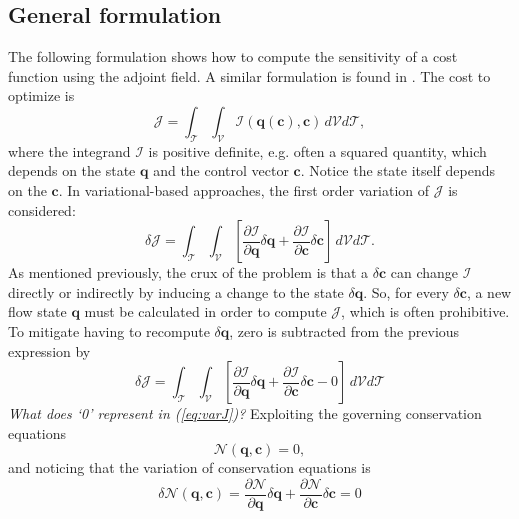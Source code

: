 \subsection{General formulation}
The following formulation shows how to compute the sensitivity of a cost function using the adjoint field. A similar formulation is found in \cite{freund2011adjoint}. The cost to optimize is
\begin{equation}
\mathcal{J} = {\int}_\mathcal{\!\!T} {\int}_\mathcal{\!\!V} \mathcal{I}(\mathbf{q}(\mathbf{c}),\mathbf{c})\,d\mathcal{V} d\mathcal{T},
\end{equation}
where the integrand $\mathcal{I}$ is positive definite, e.g. often a squared quantity, which depends on the state $\mathbf{q}$ and the control vector $\mathbf{c}$.  Notice the state itself depends on the $\mathbf{c}$.  In variational-based approaches, the first order variation of $\mathcal{J}$ is considered:
\begin{equation}
    \delta \mathcal{J} = {\int}_\mathcal{\!\!T} {\int}_\mathcal{\!\!V}\left[ \frac{\partial \mathcal{I}}{\partial \mathbf{q}} \delta \mathbf{q}+\frac{\partial \mathcal{I}}{\partial \mathbf{c}} \delta \mathbf{c}\right]\,d\mathcal{V} d\mathcal{T}.
\end{equation}
As mentioned previously, the crux of the problem is that a $\delta \mathbf{c}$ can change $\mathcal{I}$ directly or indirectly by inducing a change to the state $\delta \mathbf{q}$. So, for every $\delta \mathbf{c}$, a new flow state $\mathbf{q}$ must be calculated in order to compute $\mathcal{J}$, which is often prohibitive. To mitigate having to recompute $\delta \mathbf{q}$, zero is subtracted from the previous expression by 
\begin{equation}\label{eq:varJ}
    \delta \mathcal{J} = {\int}_\mathcal{\!\!T} {\int}_\mathcal{\!\!V}\left[ \frac{\partial \mathcal{I}}{\partial \mathbf{q}} \delta \mathbf{q}+\frac{\partial \mathcal{I}}{\partial \mathbf{c}} \delta \mathbf{c} - 0\right]\,d\mathcal{V} d\mathcal{T}
\end{equation}
\textit{What does `0' represent in (\ref{eq:varJ})?} Exploiting the governing conservation equations
\begin{equation}
    \mathcal{N}(\mathbf{q},\mathbf{c})=0,
\end{equation}
and noticing that the variation of conservation equations is
\begin{equation}\label{eq:varM}
    \delta \mathcal{N}(\mathbf{q},\mathbf{c})= \frac{\partial \mathcal{N}}{\partial \mathbf{q}}\delta \mathbf{q} + \frac{\partial \mathcal{N}}{\partial \mathbf{c}}\delta \mathbf{c} = 0
\end{equation}
